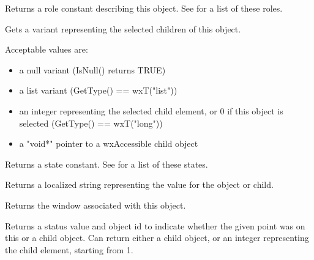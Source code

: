 
Returns a role constant describing this object. See  for a list
of these roles.

\label{wxaccessiblegetselections}


Gets a variant representing the selected children
of this object.

Acceptable values are:

\begin{itemize}
\item  a null variant (IsNull() returns TRUE)
\item  a list variant (GetType() == wxT("list"))
\item  an integer representing the selected child element,
or 0 if this object is selected (GetType() == wxT("long"))
\item a "void*" pointer to a wxAccessible child object
\end{itemize}

\label{wxaccessiblegetstate}


Returns a state constant. See  for a list
of these states.

\label{wxaccessiblegetvalue}


Returns a localized string representing the value for the object
or child.

\label{wxaccessiblegetwindow}


Returns the window associated with this object.

\label{wxaccessiblehittest}


Returns a status value and object id to indicate whether the given point was on this or
a child object. Can return either a child object, or an integer
representing the child element, starting from 1.

